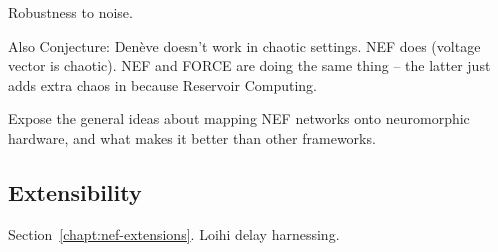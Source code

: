 Robustness to noise.

Also Conjecture: Den\`eve doesn't work in chaotic settings. NEF does (voltage vector is chaotic). NEF and FORCE are doing the same thing -- the latter just adds extra chaos in because Reservoir Computing.



Expose the general ideas about mapping NEF networks onto neuromorphic hardware, and what makes it better than other frameworks.


\subsection{Extensibility}
\label{sec:nef-extensibility}

Section~\ref{chapt:nef-extensions}. Loihi delay harnessing.
